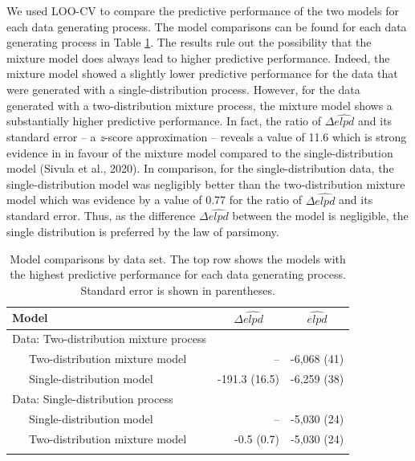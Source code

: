 \documentclass[
  english,
  man,floatsintext]{apa7}
\begin{document}
\begin{appendix}
\begin{table}[tbp]
\begin{center}
\begin{threeparttable}
\end{threeparttable}
\end{center}

\end{table}

We used LOO-CV to compare the predictive performance of the two models
for each data generating process. The model comparisons can be found for
each data generating process in Table \ref{tab:loossim}. The results
rule out the possibility that the mixture model does always lead to
higher predictive performance. Indeed, the mixture model showed a
slightly lower predictive performance for the data that were generated
with a single-distribution process. However, for the data generated with
a two-distribution mixture process, the mixture model shows a
substantially higher predictive performance. In fact, the ratio of
\(\Delta\widehat{elpd}\) and its standard error -- a \emph{z}-score
approximation -- reveals a value of 11.6 which is strong evidence in in
favour of the mixture model compared to the single-distribution model
(Sivula et al., 2020). In comparison, for the single-distribution data,
the single-distribution model was negligibly better than the
two-distribution mixture model which was evidence by a value of 0.77 for
the ratio of \(\Delta\widehat{elpd}\) and its standard error. Thus, as
the difference \(\Delta\widehat{elpd}\) between the model is negligible,
the single distribution is preferred by the law of parsimony.

\begin{table}[tbp]

\begin{center}
\begin{threeparttable}

\caption{\label{tab:loossim}Model comparisons by data set. The top row shows the models with the highest predictive performance for each data generating process. Standard error is shown in parentheses.}

\begin{tabular}{lrr}
\toprule
Model & \multicolumn{1}{c}{$\Delta\widehat{elpd}$} & \multicolumn{1}{c}{$\widehat{elpd}$}\\
\midrule
Data: Two-distribution mixture process &  & \\
\ \ \ Two-distribution mixture model & -- & -6,068 (41)\\
\ \ \ Single-distribution model & -191.3 (16.5) & -6,259 (38)\\
Data: Single-distribution process &  & \\
\ \ \ Single-distribution model & -- & -5,030 (24)\\
\ \ \ Two-distribution mixture model & -0.5 (0.7) & -5,030 (24)\\
\bottomrule
\addlinespace
\end{tabular}


\end{threeparttable}
\end{center}
\end{table}
\end{appendix}
\end{document}
